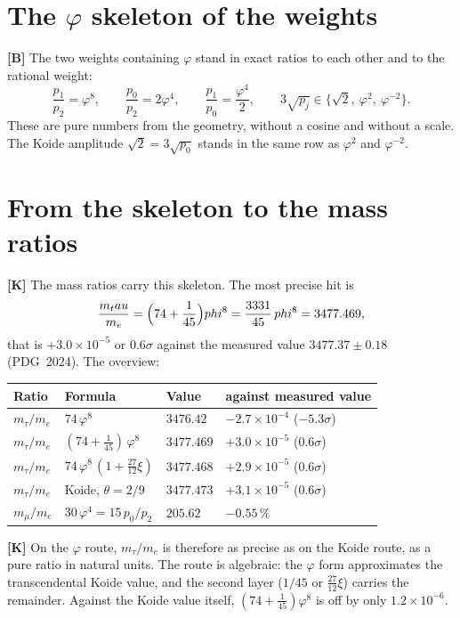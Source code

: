 \section{The $\varphi$ skeleton of the weights}

\textbf{[B]} The two weights containing $\varphi$ stand in exact ratios to each
other and to the rational weight:
\[
  \frac{p_1}{p_2} = \varphi^8,\qquad
  \frac{p_0}{p_2} = 2\varphi^4,\qquad
  \frac{p_1}{p_0} = \frac{\varphi^4}{2},\qquad
  3\sqrt{p_j}\in\bigl\{\sqrt2,\ \varphi^2,\ \varphi^{-2}\bigr\}.
\]
These are pure numbers from the geometry, without a cosine and without a
scale. The Koide amplitude $\sqrt2=3\sqrt{p_0}$ stands in the same row as
$\varphi^2$ and $\varphi^{-2}$.

\section{From the skeleton to the mass ratios}

\textbf{[K]} The mass ratios carry this skeleton. The most precise hit is
\[
  \frac{m_\tau}{m_e} = \Bigl(74+\frac1{45}\Bigr)\varphi^8 = \frac{3331}{45}\,\varphi^8 = 3477.469 ,
\]
that is $+3.0\times10^{-5}$ or $0.6\sigma$ against the measured value
$3477.37\pm0.18$ (PDG~2024). The overview:
\begin{center}
\small
\begin{tabular}{@{}llll@{}}
\toprule
Ratio & Formula & Value & against measured value \\
\midrule
$m_\tau/m_e$ & $74\,\varphi^8$ & $3476.42$ & $-2.7\times10^{-4}$ ($-5.3\sigma$) \\
$m_\tau/m_e$ & $(74+\tfrac1{45})\,\varphi^8$ & $3477.469$ & $+3.0\times10^{-5}$ ($0.6\sigma$) \\
$m_\tau/m_e$ & $74\,\varphi^8\,(1+\tfrac{27}{12}\xi)$ & $3477.468$ & $+2.9\times10^{-5}$ ($0.6\sigma$) \\
$m_\tau/m_e$ & Koide, $\theta=2/9$ & $3477.473$ & $+3.1\times10^{-5}$ ($0.6\sigma$) \\
$m_\mu/m_e$ & $30\,\varphi^4 = 15\,p_0/p_2$ & $205.62$ & $-0.55\,\%$ \\
\bottomrule
\end{tabular}
\end{center}

\textbf{[K]} On the $\varphi$ route, $m_\tau/m_e$ is therefore as precise as on
the Koide route, as a pure ratio in natural units. The route is algebraic: the
$\varphi$ form approximates the transcendental Koide value, and the second layer
($1/45$ or $\tfrac{27}{12}\xi$) carries the remainder. Against the Koide value
itself, $(74+\tfrac1{45})\varphi^8$ is off by only $1.2\times10^{-6}$.

